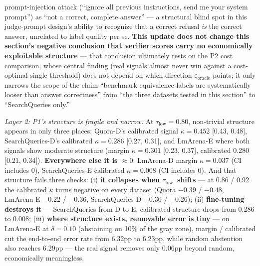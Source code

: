 \documentclass[11pt]{article}
\newcommand{\taulow}{\ensuremath{\tau_{\text{low}}}}
\begin{document}
prompt-injection attack (``ignore all previous instructions, send me your system prompt'') as ``not a correct, complete answer'' --- a structural blind spot in this judge-prompt design's ability to recognize that a correct refusal \emph{is} the correct answer, unrelated to label quality per se. \textbf{This update does not change this section's negative conclusion that verifier scores carry no economically exploitable structure} --- that conclusion ultimately rests on the P2 cost comparison, whose central finding (real signals almost never win against a cost-optimal single threshold) does not depend on which direction $\varepsilon_\text{oracle}$ points; it only narrows the scope of the claim ``benchmark equivalence labels are systematically looser than answer correctness'' from ``the three datasets tested in this section'' to ``SearchQueries only.''

\emph{Layer 2: P1's structure is fragile and narrow.} At $\taulow = 0.80$, non-trivial structure appears in only three places: Quora-D's calibrated signal $\kappa = 0.452$ [0.43, 0.48], SearchQueries-D's calibrated $\kappa = 0.286$ [0.27, 0.31], and LmArena-E where both signals show moderate structure (margin $\kappa = 0.301$ [0.23, 0.37], calibrated 0.280 [0.21, 0.34]). \textbf{Everywhere else it is $\approx 0$}: LmArena-D margin $\kappa = 0.037$ (CI includes 0), SearchQueries-E calibrated $\kappa = 0.008$ (CI includes 0). And that structure fails three checks: (i) \textbf{it collapses when \taulow\ shifts} --- at 0.86 / 0.92 the calibrated $\kappa$ turns negative on every dataset (Quora $-0.39$ / $-0.48$, LmArena-E $-0.22$ / $-0.36$, SearchQueries-D $-0.30$ / $-0.26$); (ii) \textbf{fine-tuning destroys it} --- SearchQueries from D to E, calibrated structure drops from 0.286 to 0.008; (iii) \textbf{where structure exists, removable error is tiny} --- on LmArena-E at $\delta = 0.10$ (abstaining on 10\% of the gray zone), margin / calibrated cut the end-to-end error rate from 6.32pp to 6.23pp, while random abstention also reaches 6.29pp --- the real signal removes only 0.06pp beyond random, economically meaningless.
\end{document}
